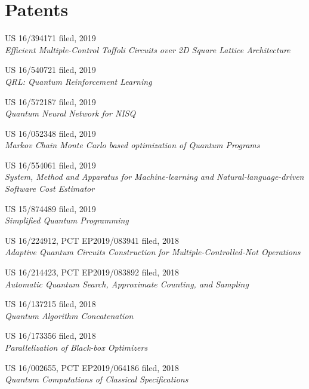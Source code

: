 \section{\sc Patents}

{\sc US 16/394171} \hfill {\sc filed}, 2019\\
\emph{Efficient Multiple-Control Toffoli Circuits over 2D Square Lattice Architecture}

{\sc US 16/540721} \hfill {\sc filed}, 2019\\
\emph{QRL: Quantum Reinforcement Learning}

{\sc US 16/572187} \hfill {\sc filed}, 2019\\
\emph{Quantum Neural Network for NISQ}

{\sc US 16/052348} \hfill {\sc filed}, 2019\\
\emph{Markov Chain Monte Carlo based optimization of Quantum Programs}

{\sc US 16/554061} \hfill {\sc filed}, 2019\\
\emph{System, Method and Apparatus for Machine-learning and Natural-language-driven \\Software Cost Estimator}

{\sc US 15/874489} \hfill {\sc filed}, 2019\\
\emph{Simplified Quantum Programming}

{\sc US 16/224912, PCT EP2019/083941} \hfill {\sc filed}, 2018\\
\emph{Adaptive Quantum Circuits Construction for Multiple-Controlled-Not Operations}

{\sc US 16/214423, PCT EP2019/083892} \hfill {\sc filed}, 2018\\
\emph{Automatic Quantum Search, Approximate Counting, and Sampling}

{\sc US 16/137215} \hfill {\sc filed}, 2018\\
\emph{Quantum Algorithm Concatenation}

{\sc US 16/173356} \hfill {\sc filed}, 2018\\
\emph{Parallelization of Black-box Optimizers}

{\sc US 16/002655, PCT EP2019/064186} \hfill {\sc filed}, 2018\\
\emph{Quantum Computations of Classical Specifications}

